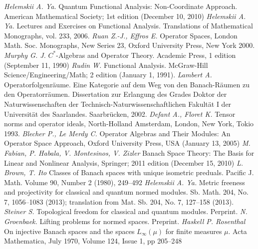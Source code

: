 \documentclass[12pt]{article}
\begin{document}
\newpage
\begin{thebibliography}{999}
\textit{Helemskii A. Ya.} Quantum Functional Analysis: Non-Coordinate Approach. 
American Mathematical Society; 
1st edition (December 10, 2010)
\textit{Helemskii A. Ya.} Lectures and Exercises on Functional Analysis. 
Translations of Mathematical Monographs, vol. 233, 2006.
\textit{Ruan Z.-J., Effros E.} Operator Spaces, 
London Math. Soc. Monographs, New Series 23, 
Oxford University Press, New York 2000.
\textit{Murphy G. J.} $C^*$-Algebras and Operator Theory. 
Academic Press, 1 edition (September 11, 1990)
\textit{Rudin W.} Functional Analysis. McGraw-Hill Science/Engineering/Math; 
2 edition (January 1, 1991).
\textit{Lambert A.} Operatorfolgenr\"{a}ume. 
Eine Kategorie auf dem Weg von den Banach-R\"{a}umen zu den Operatorr\"{a}umen. 
Dissertation zur Erlangung des Grades Doktor der Naturwissenschaften der 
Technisch-Naturwissenschaftlichen Fakult\"{a}t I der Universit\"{a}t 
des Saarlandes. Saarbr\"{u}cken, 2002.
\textit{Defant A., Floret K.} Tensor norms and operator ideals, 
North-Holland Amsterdam,
London, New York, Tokio 1993.
\textit{Blecher P., Le Merdy C.} Operator Algebras and Their Modules: 
An Operator Space Approach, Oxford University Press, USA (January 13, 2005)
\textit{M. Fabian, P. Habala, V. Montesinos, V. Zizler} Banach Space Theory: 
The Basis for Linear and Nonlinear Analysis, Springer; 
2011 edition (December 15, 2010)
\textit{L. Brown, T. Ito} Classes of Banach spaces with unique 
isometric preduals. Pacific J. Math. Volume 90, Number 2 (1980), 249--492
\textit{Helemskii A. Ya.} Metric freeness and projectivity for classical and 
quantum normed modules. Sb. Math. 204, No. 7, 1056--1083 (2013); 
translation from Mat. Sb. 204, No. 7, 127--158 (2013).
\textit{Steiner S.} Topological freedom for classical and quantum modules. 
Perprint.
\textit{N. Groenbaek.} Lifting problems for normed spaces. Preprint.
\textit{Haskell P. Rosenthal} On injective Banach spaces and the spaces 
$L_\infty(\mu)$ for finite measures $\mu$. Acta Mathematica, 
July 1970, Volume 124, Issue 1, pp 205--248
\end{thebibliography}
\end{document}
